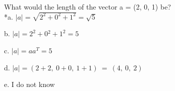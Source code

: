
What would the length of the vector a = (2, 0, 1) be? \\

*a. \(|a| = \sqrt{2^{2} + 0^{2} + 1^{2}} = \sqrt{5}\)

b. \(|a| = 2^{2} + 0{}^{2} + 1^{2} = 5\)

c. \(|a| = aa^{T} = 5\)

d. \(|a| = (2 + 2,\ 0 + 0,\ 1 + 1)\  = \ (4,\ 0,\ 2)\)

e. I do not know \\

